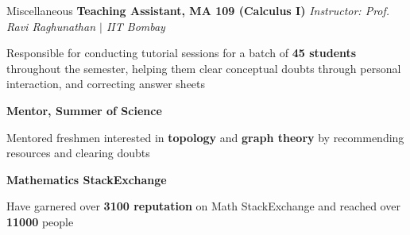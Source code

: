 \begin{rubric}{Miscellaneous}
    \entry*[2020] \textbf{Teaching Assistant, MA 109 (Calculus I)} \hfill \emph{Instructor: Prof. Ravi Raghunathan $\mid$ IIT Bombay}
	    
	    Responsible for conducting tutorial sessions for a batch of \textbf{45 students} throughout the semester, helping them clear conceptual doubts through personal interaction, and correcting answer sheets

	\entry*[2021] \textbf{Mentor, Summer of Science}

		Mentored freshmen interested in \textbf{topology} and \textbf{graph theory} by recommending resources and clearing doubts

	\entry* \textbf{Mathematics StackExchange}

		Have garnered over \textbf{3100 reputation} on Math StackExchange and reached over \textbf{11000} people
\end{rubric}
